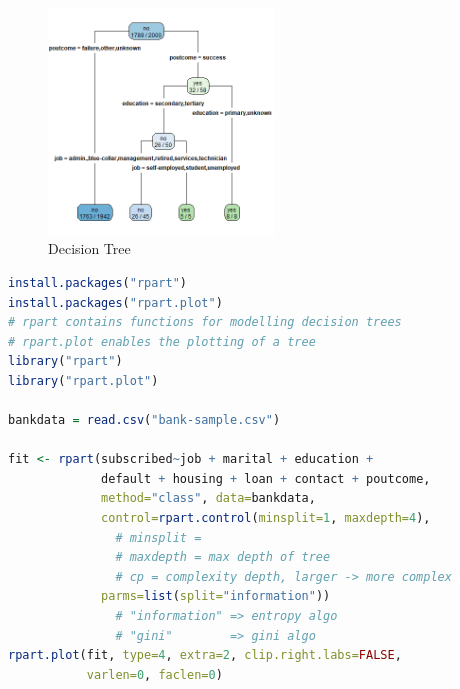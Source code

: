 \documentclass{article}
\begin{document}
\begin{figure}[H]
    \centering
    \includegraphics[width=6cm]{images/bankdata.png}
    \caption{Decision Tree}
\end{figure}

\begin{lstlisting}[language=R]
install.packages("rpart")
install.packages("rpart.plot")
# rpart contains functions for modelling decision trees
# rpart.plot enables the plotting of a tree
library("rpart")
library("rpart.plot")

bankdata = read.csv("bank-sample.csv")

fit <- rpart(subscribed~job + marital + education + 
             default + housing + loan + contact + poutcome,
             method="class", data=bankdata,
             control=rpart.control(minsplit=1, maxdepth=4),
               # minsplit =
               # maxdepth = max depth of tree
               # cp = complexity depth, larger -> more complex
             parms=list(split="information"))
               # "information" => entropy algo
               # "gini"        => gini algo
rpart.plot(fit, type=4, extra=2, clip.right.labs=FALSE,
           varlen=0, faclen=0)
\end{lstlisting}
\end{document}
